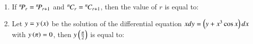 \documentclass[journal,12pt,onecolumn]{IEEEtran}
\theoremstyle{remark}
\begin{document}
\begin{enumerate}
\hfill{}
\begin{enumerate}
\end{enumerate}

\item If ${{}^{n}\mkern-3muP_{r}}={{}^{n}\mkern-3muP_{r+1}}$ and ${{}^{n}\mkern-1muC_{r}} = {{}^{n}\mkern-1muC_{r+1}}$, then the value of $r$ is equal to:
\hfill{}
\begin{enumerate}
\end{enumerate}

\item Let $y=y\left(x\right)$ be the solution of the differential equation $xdy=\left(y+x^{3}\cos x\right)dx$ with $y\left(\pi\right)=0$, then $y\left(\frac{\pi}{2}\right)$ is equal to:

\hfill{}
\begin{enumerate}
\end{enumerate}
\end{enumerate}
\end{document}
